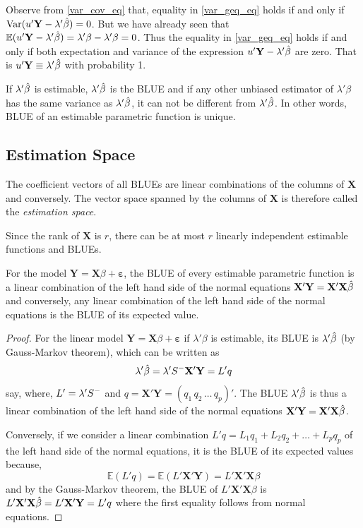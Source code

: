\documentclass[10pt, a4paper]{article}
\begin{document}
\begin{remark}
Observe from \eqref{var_cov_eq} that, equality in \eqref{var_geq_eq} holds if and only if \( \operatorname{Var}(u'\mathbf{Y} - \lambda' \hat{\beta}) = 0 \).
But we have already seen that \( \mathbb{E}(u'\mathbf{Y} - \lambda' \hat{\beta}) = \lambda' \beta - \lambda' \beta = 0 \). Thus the equality in \eqref{var_geq_eq} holds if and only if both expectation and variance of the expression \( u'\mathbf{Y} - \lambda' \hat{\beta} \) are zero. That is \( u'\mathbf{Y} \equiv \lambda' \hat{\beta} \) with probability 1.

If \( \lambda' \hat{\beta} \) is estimable, \( \lambda' \hat{\beta} \) is the BLUE and if any other unbiased estimator of \( \lambda' \beta \) has the same variance as \( \lambda' \hat{\beta} \), it can not be different from \( \lambda' \hat{\beta} \). In other words, BLUE of an estimable parametric function is unique.
\end{remark}

\subsection{Estimation Space}
\begin{definition}
The coefficient vectors of all BLUEs are linear combinations of the columns of \( \mathbf{X} \) and conversely. The vector space spanned by the columns of \( \mathbf{X} \) is therefore called the \textit{estimation space}.
\end{definition}

Since the rank of \( \mathbf{X} \) is \( r \), there can be at most \( r \) linearly independent estimable functions and BLUEs.

\begin{theorem}
For the model \( \mathbf{Y} = \mathbf{X}\beta + \mathbf{\varepsilon} \), the BLUE of every estimable parametric function is a linear combination of the left hand side of the normal equations \( \mathbf{X}'\mathbf{Y} = \mathbf{X}'\mathbf{X} \hat{\beta} \) and conversely, any linear combination of the left hand side of the normal equations is the BLUE of its expected value.
\end{theorem}
\begin{proof}
For the linear model \( \mathbf{Y} = \mathbf{X}\beta + \mathbf{\varepsilon} \) if \( \lambda'\beta \) is estimable, its BLUE is \( \lambda' \hat{\beta} \) (by Gauss-Markov theorem), which can be written as
\[ \lambda' \hat{\beta} = \lambda' S^{-}\mathbf{X}'\mathbf{Y} = L'q \] 
say, where, \( L' = \lambda' S^{-} \) and \( q = \mathbf{X}'\mathbf{Y} = (q_{1}\, q_{2}\, \dots\, q_{p})'\). The BLUE \( \lambda' \hat{\beta} \) is thus a linear combination of the left hand side of the  normal equations \( \mathbf{X}'\mathbf{Y} = \mathbf{X}'\mathbf{X} \hat{\beta} \).

Conversely, if we consider a linear combination \( L'q = L_{1}q_{1} + L_{2}q_{2} + \dots + L_{p}q_{p}\) of the left hand side of the normal equations, it is the BLUE of its expected values because,
 \[ \mathbb{E}(L'q) = \mathbb{E}(L'\mathbf{X}'\mathbf{Y}) = L'\mathbf{X}'\mathbf{X}\beta \] and by the Gauss-Markov theorem, the BLUE of \( L'\mathbf{X}'\mathbf{X}\beta \) is \( L'\mathbf{X}'\mathbf{X} \hat{\beta} = L'\mathbf{X}'\mathbf{Y} = L'q \) where the first equality follows from normal equations.
\end{proof}
\end{document}

